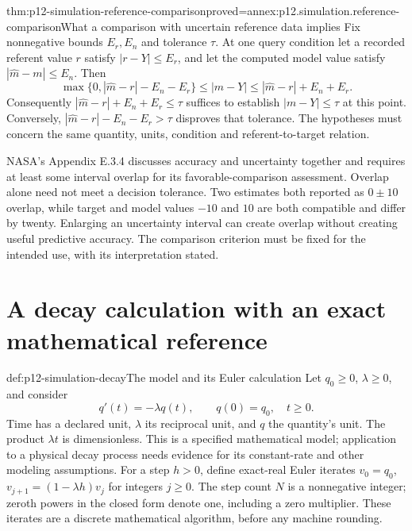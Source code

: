 \begin{hbtheorem}{thm:p12-simulation-reference-comparison}{proved=annex:p12.simulation.reference-comparison}{What a comparison with uncertain reference data implies}
Fix nonnegative bounds \(E_r,E_n\) and tolerance \(\tau\).
At one query condition let a recorded referent value \(r\) satisfy
\(|r-Y|\leq E_r\), and let the computed model value satisfy
\(|\widehat m-m|\leq E_n\). Then
\[
 \max\{0,|\widehat m-r|-E_n-E_r\}
 \leq |m-Y|\leq |\widehat m-r|+E_n+E_r.
\]
Consequently \(|\widehat m-r|+E_n+E_r\leq\tau\) suffices to
establish \(|m-Y|\leq\tau\) at this point. Conversely,
\(|\widehat m-r|-E_n-E_r>\tau\) disproves that tolerance.
The hypotheses must concern the same quantity, units, condition and
referent-to-target relation.
\end{hbtheorem}

NASA's Appendix E.3.4 discusses accuracy and uncertainty together and
requires at least some interval overlap for its favorable-comparison
assessment. Overlap alone need not meet a decision tolerance. Two
estimates both reported as \(0\pm10\) overlap, while target and
model values \(-10\) and \(10\) are both compatible and differ by
twenty. Enlarging an uncertainty interval can create overlap without
creating useful predictive accuracy. The comparison criterion must
be fixed for the intended use, with its interpretation stated.

\section{A decay calculation with an exact mathematical reference}

\begin{hbdefinition}{def:p12-simulation-decay}{The model and its Euler calculation}
Let \(q_0\geq0\), \(\lambda\geq0\), and consider
\[
 q'(t)=-\lambda q(t),\qquad q(0)=q_0,\quad t\geq0.
\]
Time has a declared unit, \(\lambda\) its reciprocal unit, and
\(q\) the quantity's unit. The product \(\lambda t\) is
dimensionless. This is a specified mathematical model; application
to a physical decay process needs evidence for its constant-rate and
other modeling assumptions. For a step \(h>0\), define exact-real
Euler iterates \(v_0=q_0\),
\(v_{j+1}=(1-\lambda h)v_j\) for integers \(j\geq0\).
The step count \(N\) is a nonnegative integer; zeroth powers in the
closed form denote one, including a zero multiplier. These iterates are a discrete
mathematical algorithm, before any machine rounding.
\end{hbdefinition}

